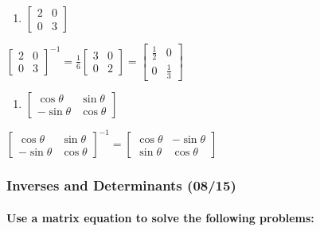 \documentclass[
  letterpaper,
  DIV=11,
  numbers=noendperiod]{scrartcl}
\let\oldparagraph\paragraph
\renewcommand{\paragraph}[1]{\oldparagraph{#1}\mbox{}}
\providecommand{\tightlist}{%
  \setlength{\itemsep}{0pt}\setlength{\parskip}{0pt}}\usepackage{longtable,booktabs,array}
\begin{document}
\begin{enumerate}
\def\labelenumi{\arabic{enumi})}
\setcounter{enumi}{1}
\tightlist
\item
  \(\begin{bmatrix}2 & 0 \\ 0 & 3 \end{bmatrix}\)
\end{enumerate}

\(\begin{bmatrix}2 & 0 \\ 0 & 3 \end{bmatrix}^{-1} = \frac{1}{6}\begin{bmatrix}3 & 0 \\ 0 & 2 \end{bmatrix}=\begin{bmatrix}\frac{1}{2} & 0 \\ 0 & \frac{1}{3}\end{bmatrix}\)

\begin{enumerate}
\def\labelenumi{\arabic{enumi})}
\setcounter{enumi}{2}
\tightlist
\item
  \(\begin{bmatrix}\cos\theta & \sin\theta \\ -\sin\theta & \cos\theta \end{bmatrix}\)
\end{enumerate}

\(\begin{bmatrix}\cos\theta & \sin\theta \\ -\sin\theta & \cos\theta \end{bmatrix}^{-1} = \begin{bmatrix}\cos\theta & -\sin\theta \\ \sin\theta & \cos\theta \end{bmatrix}\)

\hypertarget{inverses-and-determinants-0815}{%
\subsubsection{Inverses and Determinants
(08/15)}\label{inverses-and-determinants-0815}}

\hypertarget{use-a-matrix-equation-to-solve-the-following-problems}{%
\paragraph{Use a matrix equation to solve the following
problems:}\label{use-a-matrix-equation-to-solve-the-following-problems}}
\end{document}

